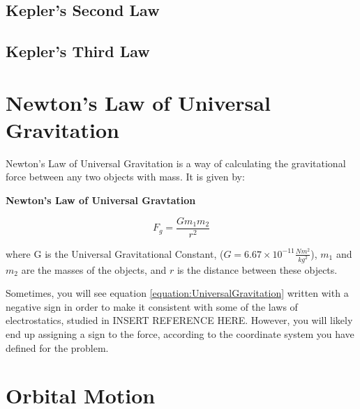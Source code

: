 	\subsection{Kepler's Second Law}
	\subsection{Kepler's Third Law}
	
	
	
	
	
	\section{Newton's Law of Universal Gravitation} 
	
	Newton's Law of Universal Gravitation is a way of calculating the gravitational force between any two objects with mass.  It is given by: 
	\begin{mdframed}[backgroundcolor=orange!20!white]
		\begin{center}
\textbf{Newton's Law of Universal Gravtation}
		\end{center}
		\begin{equation}
		F_g = \frac{G m_1m_2}{r^2}
		\label{equation:UniversalGravitation}
		\end{equation}
	\end{mdframed}
	where G is the Universal Gravitational Constant, ($G = 6.67 \times 10^{-11} \frac{Nm^2}{kg^2}$), $m_1$ and $m_2$ are the masses of the objects, and $r$ is the distance between these objects.   
	
	
	Sometimes, you will see equation \ref{equation:UniversalGravitation} written with a negative sign in order to make it consistent with some of the laws of electrostatics, studied in \color{red} INSERT REFERENCE HERE\color{black}. However, you will likely end up assigning a sign to the force, according to the coordinate system you have defined for the problem. 
	
	
	
	\section{Orbital Motion} 
	

		


	


